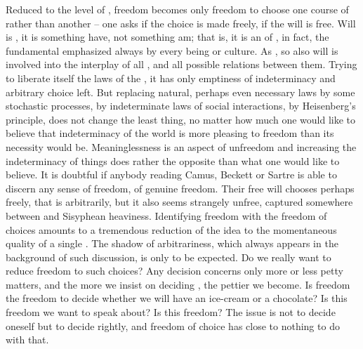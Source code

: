 Reduced to the level of , freedom becomes only freedom to choose
one course of  rather than another -- one asks if the choice is made
freely, if the will is free. 
Will is , it is something  have, not something  am; that
is, it is an  of , in fact, the fundamental  
emphasized always by every  being or culture.  As
, so also will is involved into the interplay of all , and all possible relations between them. Trying to liberate
itself  the  laws of the , it has only
emptiness of indeterminacy and arbitrary choice left.  But replacing natural,
perhaps even necessary laws by some stochastic processes, by indeterminate laws
of social interactions, by Heisenberg's principle, does not change the least
thing, no matter how much one would like to believe that indeterminacy of the
world is more pleasing to  freedom than its necessity would be.
Meaninglessness is an aspect of unfreedom and increasing the indeterminacy of
things does rather the opposite than what one would like to believe. It is doubtful if anybody reading Camus, Beckett or Sartre is able to
discern any sense of freedom, of genuine freedom.  Their free will chooses
perhaps freely, that is arbitrarily, but it also seems strangely unfree,
captured somewhere between  and Sisyphean heaviness.
Identifying freedom with the freedom of %
choices amounts to a tremendous reduction of the idea to the momentaneous quality
of a single . The shadow of arbitrariness, which always appears in the
background of such discussion, is only to be expected.
Do we really want to reduce freedom to such  choices? Any
 decision concerns only more or less petty matters, and the more
we insist on deciding , the pettier we become. Is 
freedom the freedom to decide whether we will have an ice-cream or a chocolate?
Is this freedom we want to speak about? Is this freedom? The issue is not to
decide oneself but to decide rightly, and freedom of choice has close to
nothing to do with that.

